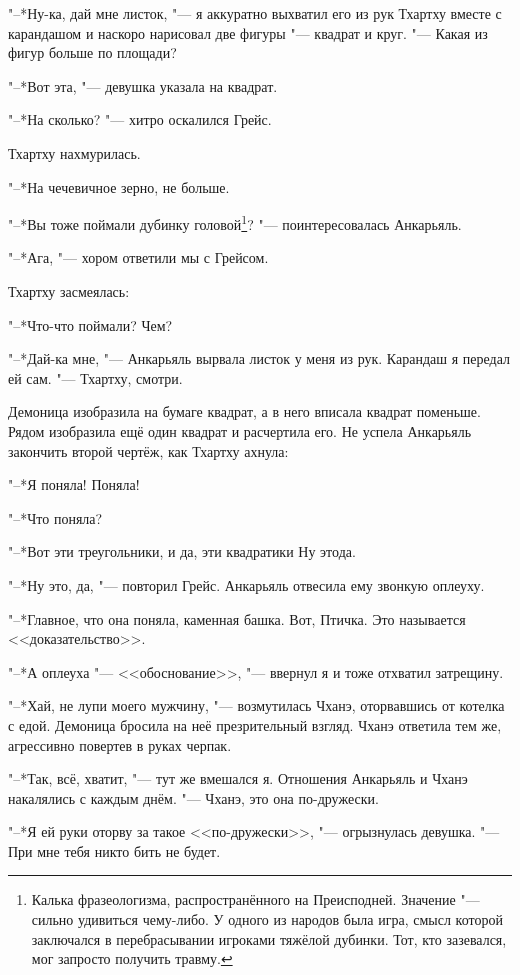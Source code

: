 "--*Ну-ка, дай мне листок, "--- я аккуратно выхватил его из рук Тхартху вместе с карандашом и наскоро нарисовал две фигуры "--- квадрат и круг.
"--- Какая из фигур больше по площади?

"--*Вот эта, "--- девушка указала на квадрат.

"--*На сколько? "--- хитро оскалился Грейс.

Тхартху нахмурилась.

"--*На чечевичное зерно, не больше.

"--*Вы тоже поймали дубинку головой\footnote
{Калька фразеологизма, распространённого на Преисподней.
Значение "--- сильно удивиться чему-либо.
У одного из народов была игра, смысл которой заключался в перебрасывании игроками тяжёлой дубинки.
Тот, кто зазевался, мог запросто получить травму. \authornote}? "--- поинтересовалась Анкарьяль.

"--*Ага, "--- хором ответили мы с Грейсом.

Тхартху засмеялась:

"--*Что-что поймали?
Чем?

"--*Дай-ка мне, "--- Анкарьяль вырвала листок у меня из рук.
Карандаш я передал ей сам.
"--- Тхартху, смотри.

Демоница изобразила на бумаге квадрат, а в него вписала квадрат поменьше.
Рядом изобразила ещё один квадрат и расчертила его.
Не успела Анкарьяль закончить второй чертёж, как Тхартху ахнула:

"--*Я поняла!
Поняла!

"--*Что поняла?

"--*Вот эти треугольники, и да, эти квадратики\ldotse
Ну это\ldotst да.

"--*Ну это, да, "--- повторил Грейс.
Анкарьяль отвесила ему звонкую оплеуху.

"--*Главное, что она поняла, каменная башка.
Вот, Птичка.
Это называется <<доказательство>>.

"--*А оплеуха "--- <<обоснование>>, "--- ввернул я и тоже отхватил затрещину.

"--*Хай, не лупи моего мужчину, "--- возмутилась Чханэ, оторвавшись от котелка с едой.
Демоница бросила на неё презрительный взгляд.
Чханэ ответила тем же, агрессивно повертев в руках черпак.

"--*Так, всё, хватит, "--- тут же вмешался я.
Отношения Анкарьяль и Чханэ накалялись с каждым днём.
"--- Чханэ, это она по-дружески.

"--*Я ей руки оторву за такое <<по-дружески>>, "--- огрызнулась девушка.
"--- При мне тебя никто бить не будет.

